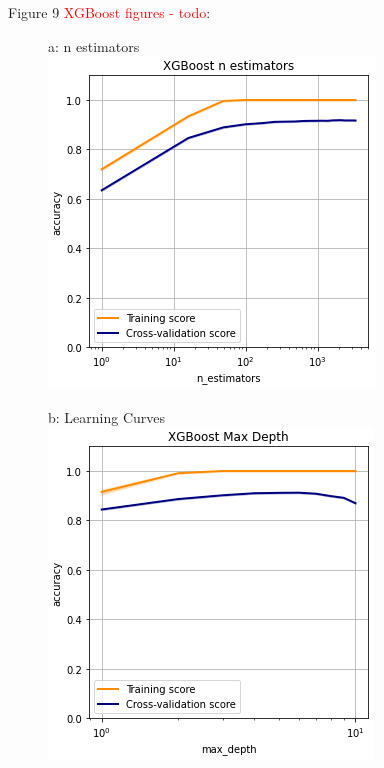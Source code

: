 \documentclass{article}
\newcommand\todo[1]{\textcolor{red}{#1}}
\begin{document}
\begin{figure}
	\centering
	Figure 9 \todo{ XGBoost figures - todo}:\\
	\begin{subfigure}{.30\textwidth}
		\centering
		a: n estimators\\
		\includegraphics[width=\linewidth]{mnist_xgboost_n_estimators.png}
		
	\end{subfigure}
	\begin{subfigure}{.30\textwidth}
		\centering
		b: Learning Curves\\
		\includegraphics[width=\linewidth]{mnist_xgboost_max_depth.png}
		

\end{subfigure}
\end{figure}
\end{document}
